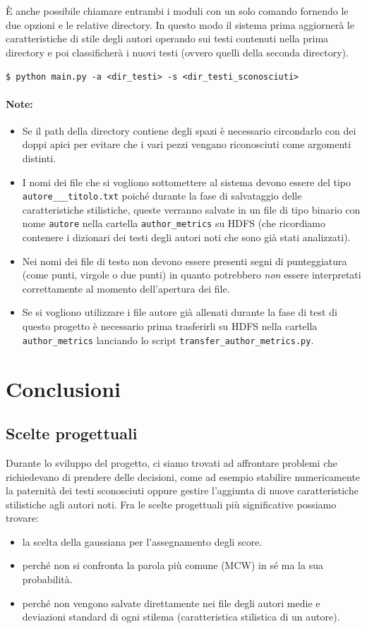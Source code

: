 \documentclass[titlepage]{article}
\begin{document}
\noindent
\`{E} anche possibile chiamare entrambi i moduli con un solo comando fornendo le due opzioni e le relative directory. In questo modo il sistema prima aggiornerà le caratteristiche di stile degli autori operando sui testi contenuti nella prima directory e poi classificherà i nuovi testi (ovvero quelli della seconda directory).
\bigskip

\texttt{\$ python main.py -a <dir\_testi> -s <dir\_testi\_sconosciuti>}

\paragraph{Note:}
\begin{itemize}
    \item Se il path della directory contiene degli spazi è necessario circondarlo con dei doppi apici per evitare che i vari pezzi vengano riconosciuti come argomenti distinti.
    \item I nomi dei file che si vogliono sottomettere al sistema devono essere del tipo \texttt{autore\_\_\_titolo.txt} poiché durante la fase di salvataggio delle caratteristiche stilistiche, queste verranno salvate in un file di tipo binario con nome \texttt{autore} nella cartella \texttt{author\_metrics} su HDFS (che ricordiamo contenere i dizionari dei testi degli autori noti che sono già stati analizzati).
    \item Nei nomi dei file di testo non devono essere presenti segni di punteggiatura (come punti, virgole o due punti) in quanto potrebbero \emph{non} essere interpretati correttamente al momento dell'apertura dei file.
    \item Se si vogliono utilizzare i file autore già allenati durante la fase di test di questo progetto è necessario prima trasferirli su HDFS nella cartella \texttt{author\_metrics} lanciando lo script \texttt{transfer\_author\_metrics.py}.
\end{itemize}


\newpage
\section{Conclusioni}
\label{sec:6}
\subsection{Scelte progettuali}
Durante lo sviluppo del progetto, ci siamo trovati ad affrontare problemi che richiedevano di prendere delle decisioni, come ad esempio stabilire numericamente la paternità dei testi sconosciuti oppure gestire l'aggiunta di nuove caratteristiche stilistiche agli autori noti. Fra le scelte progettuali più significative possiamo trovare:
\begin{itemize}
    \item la scelta della gaussiana per l'assegnamento degli score.
    \item perché non si confronta la parola più comune (MCW) in sé ma la sua probabilità.
    \item perché non vengono salvate direttamente nei file degli autori medie e deviazioni standard di ogni stilema (caratteristica stilistica di un autore).
\end{itemize}
\end{document}

